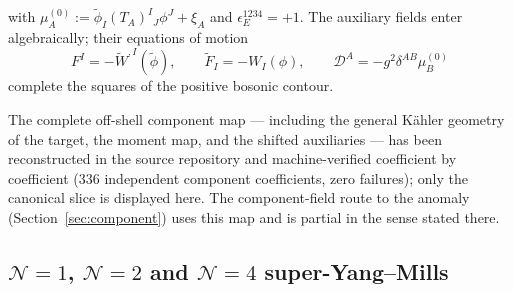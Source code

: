 with $\mu_A^{(0)}:=\widetilde\phi_I(T_A)^I{}_J\phi^J+\xi_A$ and $\epsilon_E^{1234}=+1$. The auxiliary fields enter algebraically; their equations of motion
\begin{equation}\label{eq:gaugebv:auxeom}
F^I=-\widetilde W^{,I}(\widetilde\phi),\qquad
\widetilde F_I=-W_I(\phi),\qquad
\mathscr D^A=-g^2\delta^{AB}\mu_B^{(0)}
\end{equation}
complete the squares of the positive bosonic contour.

\begin{remark}\label{rem:gaugebv:componentmap}
The complete off-shell component map --- including the general K\"ahler geometry of the target, the moment map, and the shifted auxiliaries --- has been reconstructed in the source repository and machine-verified coefficient by coefficient ($336$ independent component coefficients, zero failures); only the canonical slice is displayed here. The component-field route to the anomaly (Section~\ref{sec:component}) uses this map and is partial in the sense stated there.
\end{remark}

\subsection{$\mathcal N=1$, $\mathcal N=2$ and $\mathcal N=4$ super-Yang--Mills}\label{sec:gaugebv:extended}


